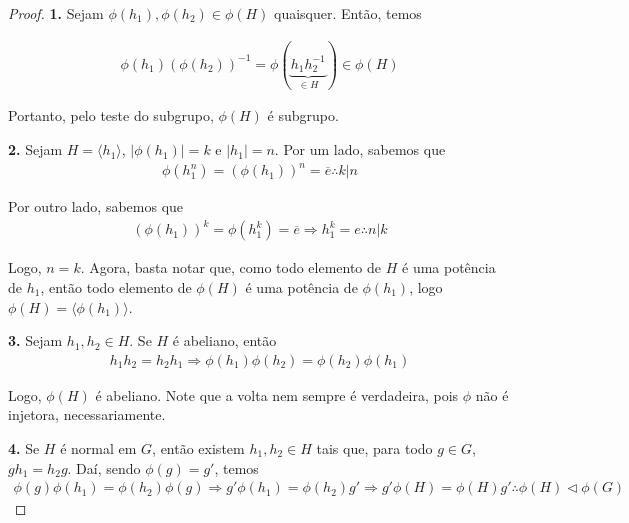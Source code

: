 	\begin{proof}
		\textbf{1.} Sejam $\phi(h_1), \phi(h_2)\in \phi(H)$ quaisquer. Então, temos
		
		\begin{align*}
		\phi(h_1)(\phi(h_2))^{-1} = \phi(\underbrace{h_1h_2^{-1}}_{\in H}) \in\phi(H)
		\end{align*}
		
		\par\vspace{0.3cm} Portanto, pelo teste do subgrupo, $\phi(H)$ é subgrupo.
		
		\par\vspace{0.3cm}\hspace{17pt}\textbf{2.} Sejam $H = \langle h_1 \rangle$, $|\phi(h_1)| = k$ e $|h_1| = n$. Por um lado, sabemos que
		\begin{align*}
		\phi(h_1^n) = (\phi(h_1))^n = \overline{e}\therefore k|n
		\end{align*}
		\par\vspace{0.3cm} Por outro lado, sabemos que
		\begin{align*}
		(\phi(h_1))^k = \phi(h_1^k) = \overline{e}\Rightarrow h_1^k = e\therefore n|k
		\end{align*}
		
		\par\vspace{0.3cm} Logo, $n = k$. Agora, basta notar que, como todo elemento de $H$ é uma potência de $h_1$, então todo elemento de $\phi(H)$ é uma potência de $\phi(h_1)$, logo $\phi(H) = \langle \phi(h_1) \rangle$. 
		
		\par\vspace{0.3cm}\hspace{17pt}\textbf{3.} Sejam $h_1, h_2\in H$. Se $H$ é abeliano, então
		\begin{align*}
		h_1h_2 = h_2h_1 \Rightarrow \phi(h_1)\phi(h_2) = \phi(h_2)\phi(h_1)
		\end{align*}
		
		\par\vspace{0.3cm} Logo, $\phi(H)$ é abeliano. Note que a volta nem sempre é verdadeira, pois $\phi$ não é injetora, necessariamente.
		
		\par\vspace{0.3cm}\hspace{17pt}\textbf{4.} Se $H$ é normal em $G$, então existem $h_1, h_2\in H$ tais que, para todo $g\in G$, $gh_1 = h_2g$. Daí, sendo $\phi(g) = g'$, temos
		\begin{align*}
		\phi(g)\phi(h_1) = \phi(h_2)\phi(g) \Rightarrow g'\phi(h_1) = \phi(h_2)g' \Rightarrow g'\phi(H) = \phi(H)g' \therefore \phi(H)\vartriangleleft\phi(G)
		\end{align*}
		

\end{proof}
